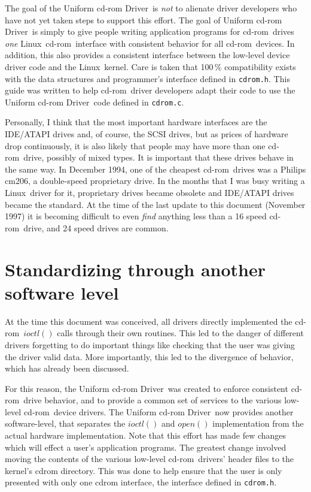 \documentclass{article}
\newcommand{\newsection}[1]{\newpage\section{#1}}
\def\linux{{\sc Linux}}
\def\cdrom{{\sc cd-rom}}
\def\UCD{{\sc Uniform cd-rom Driver}}
\def\cdromc{{\tt {cdrom.c}}}
\def\cdromh{{\tt {cdrom.h}}}
\begin{document}
The goal of the \UCD\ is {\em not\/} to alienate driver developers who
have not yet taken steps to support this effort. The goal of \UCD\ is
simply to give people writing application programs for \cdrom\ drives
{\em one\/} \linux\ \cdrom\ interface with consistent behavior for all
\cdrom\ devices. In addition, this also provides a consistent interface
between the low-level device driver code and the \linux\ kernel. Care
is taken that 100\,\% compatibility exists with the data structures and
programmer's interface defined in \cdromh. This guide was written to
help \cdrom\ driver developers adapt their code to use the \UCD\ code
defined in \cdromc.

Personally, I think that the most important hardware interfaces are
the IDE/ATAPI drives and, of course, the SCSI drives, but as prices
of hardware drop continuously, it is also likely that people may have
more than one \cdrom\ drive, possibly of mixed types. It is important
that these drives behave in the same way. In December 1994, one of the
cheapest \cdrom\ drives was a Philips cm206, a double-speed proprietary
drive. In the months that I was busy writing a \linux\ driver for it,
proprietary drives became obsolete and IDE/ATAPI drives became the
standard. At the time of the last update to this document (November
1997) it is becoming difficult to even {\em find} anything less than a
16 speed \cdrom\ drive, and 24 speed drives are common.

\newsection{Standardizing through another software level}
\label{cdrom.c}

At the time this document was conceived, all drivers directly
implemented the \cdrom\ $ioctl()$ calls through their own routines. This
led to the danger of different drivers forgetting to do important things
like checking that the user was giving the driver valid data. More
importantly, this led to the divergence of behavior, which has already
been discussed.

For this reason, the \UCD\ was created to enforce consistent \cdrom\
drive behavior, and to provide a common set of services to the various
low-level \cdrom\ device drivers. The \UCD\ now provides another
software-level, that separates the $ioctl()$ and $open()$ implementation
from the actual hardware implementation. Note that this effort has
made few changes which will effect a user's application programs. The
greatest change involved moving the contents of the various low-level
\cdrom\ drivers' header files to the kernel's cdrom directory. This was
done to help ensure that the user is only presented with only one cdrom
interface, the interface defined in \cdromh.
\end{document}
